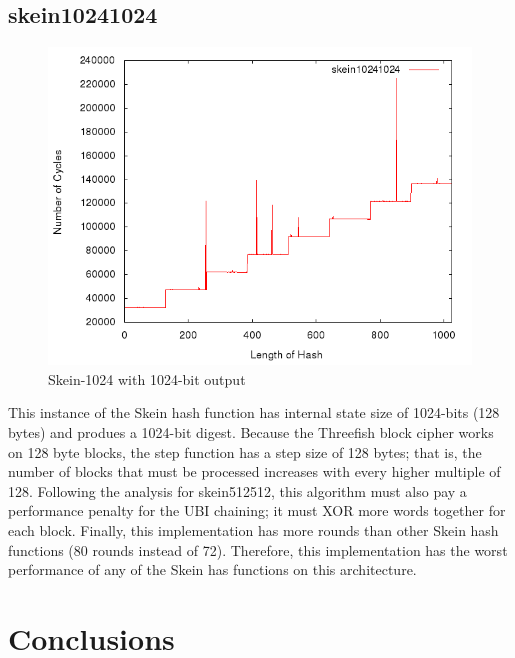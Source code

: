 \documentclass[10pt,a4paper]{article}
\begin{document}
\subsection{skein10241024}
    \begin{figure}[H]
        \begin{center}
            \includegraphics[scale=0.5]{images/skein10241024.png} 
            \caption{Skein-1024 with 1024-bit output}
        \end{center}
    \end{figure}

This instance of the Skein hash function has internal state size of 1024-bits (128 bytes) and produes a 1024-bit digest.  Because the Threefish block cipher works on 128 byte blocks, the step function has a step size of 128 bytes; that is, the number of blocks that must be processed increases with every higher multiple of 128.  Following the analysis for skein512512, this algorithm must also pay a performance penalty for the UBI chaining; it must XOR more words together for each block.  Finally, this implementation has more rounds than other Skein hash functions (80 rounds instead of 72).  Therefore, this implementation has the worst performance of any of the Skein has functions on this architecture.

\section*{Conclusions}
\end{document}
